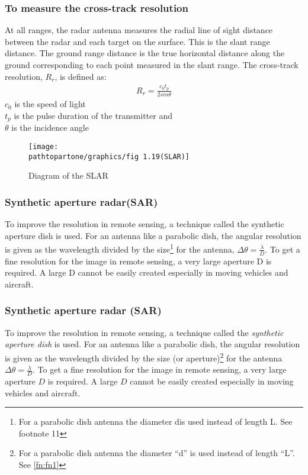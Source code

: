 \subsubsection{To measure the cross-track resolution}
At all ranges, the radar antenna measures the radial line of sight distance between the radar and each target on the surface. This is the slant range distance. The ground range distance is the true horizontal distance along the ground corresponding to each point measured in the slant range. The cross-track resolution, $R_{r}$, is defined as:  
\begin{align}
R_{r}=\frac{c_{0} t_{p}}{2 sin\theta}
\end{align}
$c_{0}$ is the speed of light\\
$t_{p}$ is the pulse duration of the transmitter and\\
$\theta$ is the incidence angle


\begin{figure}[h]
\centering
\texttt{[image: \\pathtopartone/graphics/fig 1.19(SLAR)]}
\caption{Diagram of the SLAR}
\end{figure}

\subsubsection{Synthetic aperture radar(SAR)}
To improve the resolution in remote sensing, a technique called the synthetic aperture dish is used. For an antenna like a parabolic dish, the angular resolution is given as the wavelength divided by the size\footnote{For a parabolic dish antenna the diameter \textquotesingle d\textquotesingle is used instead of length \textquotesingle L\textquotesingle. See footnote 11} for the antenna, $\Delta \theta = \frac{\lambda}{D}$. To get a fine resolution for the image in remote sensing, a very large aperture D is required. A large D cannot be easily created especially in moving vehicles and aircraft.\\

\subsubsection{Synthetic aperture radar (SAR)}
To improve the resolution in remote sensing, a technique called the \textit{synthetic aperture dish} is used. For an antenna like a parabolic dish, the angular resolution is given as the wavelength divided by the size (or aperture)\footnote{For a parabolic dish antenna the diameter \textquotedblleft d\textquotedblright \hspace{0.02in} is used instead of length \textquotedblleft L\textquotedblright. See \autoref{fn:fn1}} for the antenna $\Delta \theta = \frac{\lambda}{D}$. To get a fine resolution for the image in remote sensing, a very large aperture $D$ is required. A large $D$ cannot be easily created especially in moving vehicles and aircraft.

